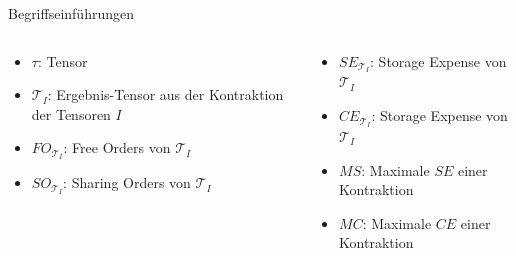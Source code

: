 \documentclass{beamer}
\newcommand{\Tau}{\mathcal{T}}
\begin{document}
\begin{frame}{Begriffseinführungen}
	\begin{columns}
		\begin{column}{0.5\textwidth}
			\begin{itemize}
				\item $\tau$: Tensor
				\item $\Tau_I$: Ergebnis-Tensor aus der Kontraktion der Tensoren $I$
				\item $FO_{\Tau_I}$: Free Orders von $\Tau_I$
				\item $SO_{\Tau_I}$: Sharing Orders von $\Tau_I$
			\end{itemize}
		\end{column}
		\begin{column}{0.5\textwidth}
			\begin{itemize}
				\item $SE_{\Tau_I}$: Storage Expense von $\Tau_I$
				\item $CE_{\Tau_I}$: Storage Expense von $\Tau_I$
				\item $MS$: Maximale $SE$ einer Kontraktion
				\item $MC$: Maximale $CE$ einer Kontraktion
			\end{itemize}
		\end{column}
	\end{columns}
\end{frame}
\end{document}
